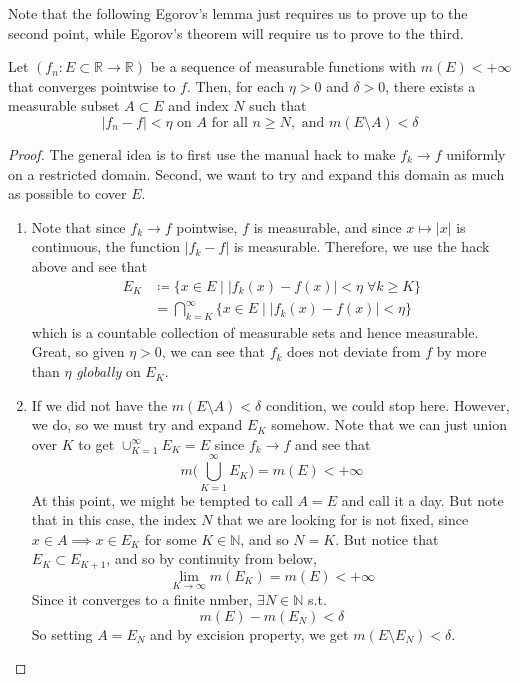   Note that the following Egorov's lemma just requires us to prove up to the second point, while Egorov's theorem will require us to prove to the third. 

  \begin{lemma}[Egorov]
    Let $(f_n: E \subset \mathbb{R} \to \mathbb{R})$ be a sequence of measurable functions with $m(E) < +\infty$ that converges pointwise to $f$. Then, for each $\eta > 0$ and $\delta > 0$, there exists a measurable subset $A \subset E$ and index $N$ such that 
    \begin{equation}
      |f_n - f| < \eta \text{ on } A \text{ for all } n \geq N, \text{ and } m(E \setminus A) < \delta 
    \end{equation}
  \end{lemma}
  \begin{proof}
    The general idea is to first use the manual hack to make $f_k \to f$ uniformly on a restricted domain. Second, we want to try and expand this domain as much as possible to cover $E$. 
    \begin{enumerate}
      \item Note that since $f_k \to f$ pointwise, $f$ is measurable, and since $x \mapsto |x|$ is continuous, the function $|f_k - f|$ is measurable. Therefore, we use the hack above and see that 
      \begin{align}
        E_K & \coloneqq \{ x \in E \mid |f_k (x) - f(x)| < \eta \; \forall k \geq K \} \\ 
            & = \bigcap_{k=K}^\infty \{x \in E \mid |f_k (x) - f(x)| < \eta \}
      \end{align}
      which is a countable collection of measurable sets and hence measurable. Great, so given $\eta > 0$, we can see that $f_k$ does not deviate from $f$ by more than $\eta$ \textit{globally} on $E_K$. 

      \item If we did not have the $m(E \setminus A) < \delta$ condition, we could stop here. However, we do, so we must try and expand $E_K$ somehow. Note that we can just union over $K$ to get $\cup_{K=1}^\infty E_K = E$ since $f_k \to f$ and see that 
      \begin{equation}
        m \bigg( \bigcup_{K=1}^\infty E_K \bigg) = m(E) < +\infty
      \end{equation}
      At this point, we might be tempted to call $A = E$ and call it a day. But note that in this case, the index $N$ that we are looking for is not fixed, since $x \in A \implies x \in E_K$ for some $K \in \mathbb{N}$, and so $N = K$. But notice that $E_K \subset E_{K+1}$, and so by continuity from below, 
      \begin{equation}
        \lim_{K \to \infty} m(E_K) = m(E) < +\infty
      \end{equation}
      Since it converges to a finite nmber, $\exists N \in \mathbb{N}$ s.t. 
      \begin{equation}
        m(E) - m(E_N) < \delta
      \end{equation}
      So setting $A = E_N$ and by excision property, we get $m(E \setminus E_N) < \delta$. 
    \end{enumerate}
  \end{proof}


